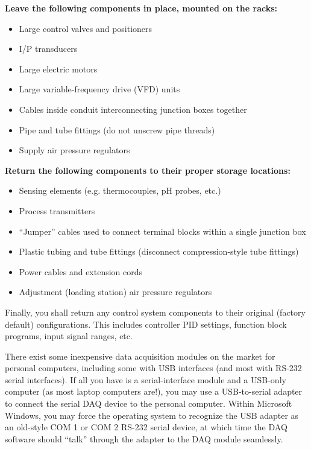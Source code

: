 \vskip 10pt

\indent
{\bf Leave the following components in place, mounted on the racks:}

\begin{itemize}
\item{} Large control valves and positioners
\item{} I/P transducers
\item{} Large electric motors
\item{} Large variable-frequency drive (VFD) units
\item{} Cables inside conduit interconnecting junction boxes together
\item{} Pipe and tube fittings (do not unscrew pipe threads)
\item{} Supply air pressure regulators
\end{itemize}

\vskip 10pt

\indent
{\bf Return the following components to their proper storage locations:}

\begin{itemize}
\item{} Sensing elements (e.g. thermocouples, pH probes, etc.)
\item{} Process transmitters
\item{} ``Jumper'' cables used to connect terminal blocks within a single junction box
\item{} Plastic tubing and tube fittings (disconnect compression-style tube fittings)
\item{} Power cables and extension cords
\item{} Adjustment (loading station) air pressure regulators
\end{itemize}

\vskip 10pt

Finally, you shall return any control system components to their original (factory default) configurations.  This includes controller PID settings, function block programs, input signal ranges, etc.








There exist some inexpensive data acquisition modules on the market for personal computers, including some with USB interfaces (and most with RS-232 serial interfaces).  If all you have is a serial-interface module and a USB-only computer (as most laptop computers are!), you may use a USB-to-serial adapter to connect the serial DAQ device to the personal computer.  Within Microsoft Windows, you may force the operating system to recognize the USB adapter as an old-style COM 1 or COM 2 RS-232 serial device, at which time the DAQ software should ``talk'' through the adapter to the DAQ module seamlessly.


